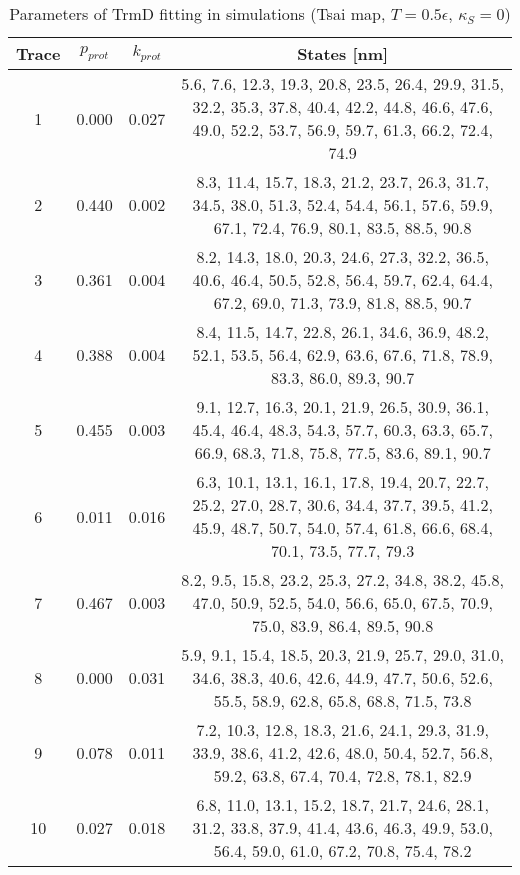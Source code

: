 \begin{table}
    \tiny
    \centering
    \caption{Parameters of TrmD fitting in simulations (Tsai map, $T=0.5\epsilon$, $\kappa_S=0$)}
    \label{tab:trmd-pd-parameters}
    \begin{tabular}{c|c|c|c}
        \textbf{Trace} & \textbf{$p_{prot}$} & \textbf{$k_{prot}$} & \textbf{States [nm]}\\\hline
        1 & 0.000 & 0.027 & 5.6, 7.6, 12.3, 19.3, 20.8, 23.5, 26.4, 29.9, 31.5, 32.2, 35.3, 37.8, 40.4, 42.2, 44.8, 46.6, 47.6, 49.0, 52.2, 53.7, 56.9, 59.7, 61.3, 66.2, 72.4, 74.9\\
        2 & 0.440 & 0.002 & 8.3, 11.4, 15.7, 18.3, 21.2, 23.7, 26.3, 31.7, 34.5, 38.0, 51.3, 52.4, 54.4, 56.1, 57.6, 59.9, 67.1, 72.4, 76.9, 80.1, 83.5, 88.5, 90.8\\
        3 & 0.361 & 0.004 & 8.2, 14.3, 18.0, 20.3, 24.6, 27.3, 32.2, 36.5, 40.6, 46.4, 50.5, 52.8, 56.4, 59.7, 62.4, 64.4, 67.2, 69.0, 71.3, 73.9, 81.8, 88.5, 90.7\\
        4 & 0.388 & 0.004 & 8.4, 11.5, 14.7, 22.8, 26.1, 34.6, 36.9, 48.2, 52.1, 53.5, 56.4, 62.9, 63.6, 67.6, 71.8, 78.9, 83.3, 86.0, 89.3, 90.7\\
        5 & 0.455 & 0.003 & 9.1, 12.7, 16.3, 20.1, 21.9, 26.5, 30.9, 36.1, 45.4, 46.4, 48.3, 54.3, 57.7, 60.3, 63.3, 65.7, 66.9, 68.3, 71.8, 75.8, 77.5, 83.6, 89.1, 90.7\\
        6 & 0.011 & 0.016 & 6.3, 10.1, 13.1, 16.1, 17.8, 19.4, 20.7, 22.7, 25.2, 27.0, 28.7, 30.6, 34.4, 37.7, 39.5, 41.2, 45.9, 48.7, 50.7, 54.0, 57.4, 61.8, 66.6, 68.4, 70.1, 73.5, 77.7, 79.3\\
        7 & 0.467 & 0.003 & 8.2, 9.5, 15.8, 23.2, 25.3, 27.2, 34.8, 38.2, 45.8, 47.0, 50.9, 52.5, 54.0, 56.6, 65.0, 67.5, 70.9, 75.0, 83.9, 86.4, 89.5, 90.8\\
        8 & 0.000 & 0.031 & 5.9, 9.1, 15.4, 18.5, 20.3, 21.9, 25.7, 29.0, 31.0, 34.6, 38.3, 40.6, 42.6, 44.9, 47.7, 50.6, 52.6, 55.5, 58.9, 62.8, 65.8, 68.8, 71.5, 73.8\\
        9 & 0.078 & 0.011 & 7.2, 10.3, 12.8, 18.3, 21.6, 24.1, 29.3, 31.9, 33.9, 38.6, 41.2, 42.6, 48.0, 50.4, 52.7, 56.8, 59.2, 63.8, 67.4, 70.4, 72.8, 78.1, 82.9\\
        10 & 0.027 & 0.018 & 6.8, 11.0, 13.1, 15.2, 18.7, 21.7, 24.6, 28.1, 31.2, 33.8, 37.9, 41.4, 43.6, 46.3, 49.9, 53.0, 56.4, 59.0, 61.0, 67.2, 70.8, 75.4, 78.2\\\hline
    \end{tabular}
\end{table}

